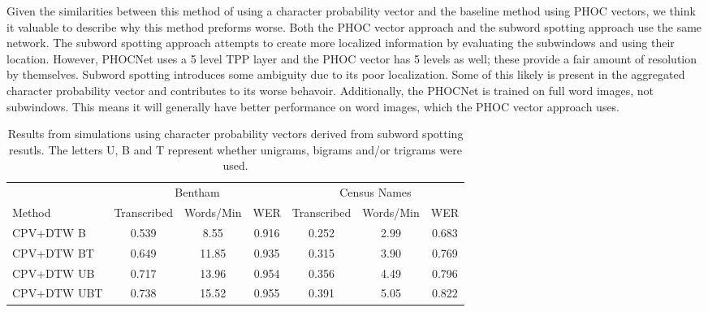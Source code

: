 \documentclass[ms,electronic,twosidetoc,letterpaper,chaptercenter,parttop,lof,lot]{byumsphd}
\begin{document}
Given the similarities between this method of using a character probability vector and the baseline method using PHOC vectors, we think it valuable to describe why this method preforms worse.
Both the PHOC vector approach and the subword spotting approach use the same network. The subword spotting approach attempts to create more localized information by evaluating the subwindows and using their location. However, PHOCNet uses a 5 level TPP layer and the PHOC vector has 5 levels as well; these provide a fair amount of resolution by themselves. Subword spotting introduces some ambiguity due to its poor localization. Some of this likely is present in the aggregated character probability vector and contributes to its worse behavoir. Additionally, the PHOCNet is trained on full word images, not subwindows. This means it will generally have better performance on word images, which the PHOC vector approach uses.


\begin{table}
\centering
\begin{tabular}{| l | c c c | c c c |}
  \hline
   & \multicolumn{3}{c|}{Bentham} & \multicolumn{3}{c|}{Census Names}\\
  Method & Transcribed & Words/Min & WER & Transcribed & Words/Min & WER\\
  \hline  
  CPV+DTW B & 0.539 & 8.55 & 0.916 & 0.252 & 2.99 & 0.683 \\
  CPV+DTW BT & 0.649 & 11.85 & 0.935 & 0.315 & 3.90 & 0.769 \\
  CPV+DTW UB & 0.717 & 13.96 & 0.954 & 0.356 & 4.49 & 0.796 \\
  CPV+DTW UBT & 0.738 & 15.52 & 0.955 & 0.391 & 5.05 & 0.822 \\
  \hline  
\end{tabular}
\caption{Results from simulations using character probability vectors derived from subword spotting resutls. The letters U, B and T represent whether unigrams, bigrams and/or trigrams were used.}
\label{tab:dtwresults}
\end{table}
\end{document}
